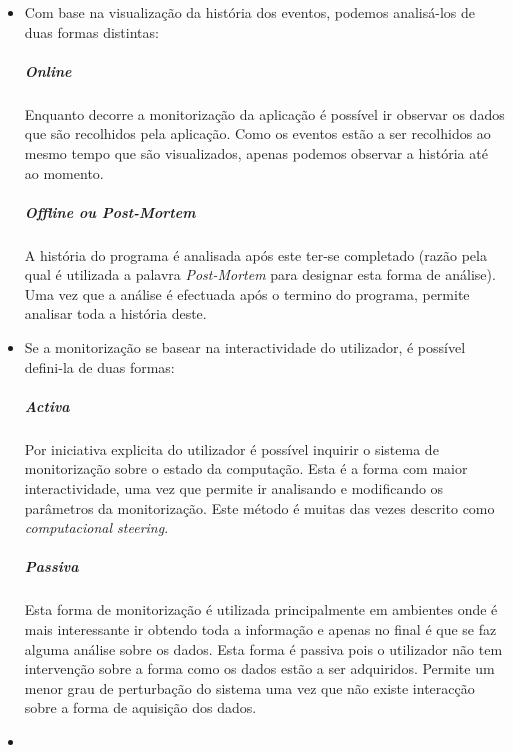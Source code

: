 \begin{itemize}
 \item 


Com base na visualização da história dos eventos, podemos analisá-los de duas formas distintas:
\subparagraph*{Online}
Enquanto decorre a monitorização da aplicação é possível ir observar os dados que são recolhidos pela aplicação.
Como os eventos estão a ser recolhidos ao mesmo tempo que são visualizados, apenas podemos observar a história até ao momento.

\subparagraph*{Offline ou \textit{Post-Mortem}}
A história do programa é analisada após este ter-se completado (razão pela qual é utilizada a palavra \textit{Post-Mortem} para designar esta forma de análise).
Uma vez que a análise é efectuada após o termino do programa, permite analisar toda a história deste.

\item

Se a monitorização se basear na interactividade do utilizador, é possível defini-la de duas formas:

\subparagraph*{Activa}

Por iniciativa explicita do utilizador é possível inquirir o sistema de monitorização sobre o estado da computação.
Esta é a forma com maior interactividade, uma vez que permite ir analisando e modificando os parâmetros da monitorização.
Este método é muitas das vezes descrito como \textit{computacional steering}.


\subparagraph*{Passiva}
Esta forma de monitorização é utilizada principalmente em ambientes onde é mais interessante ir obtendo toda a informação e apenas no final é que se faz alguma análise sobre os dados.
Esta forma é passiva pois o utilizador não tem intervenção sobre a forma como os dados estão a ser adquiridos.
Permite um menor grau de perturbação do sistema uma vez que não existe interacção sobre a forma de aquisição dos dados. 
\item


\end{itemize}
